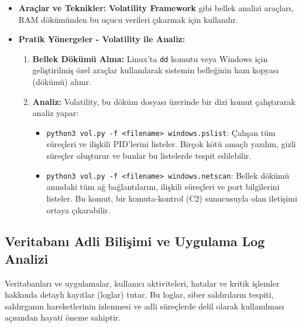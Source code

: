 \begin{itemize}
    \item \textbf{Araçlar ve Teknikler:} \textbf{Volatility Framework} gibi bellek analizi araçları, RAM dökümünden bu uçucu verileri çıkarmak için kullanılır.
    \item \textbf{Pratik Yönergeler - Volatility ile Analiz:}
    \begin{enumerate}
        \item \textbf{Bellek Dökümü Alma:} Linux'ta \texttt{dd} komutu veya Windows için geliştirilmiş özel araçlar kullanılarak sistemin belleğinin ham kopyası (dökümü) alınır.
        \item \textbf{Analiz:} Volatility, bu döküm dosyası üzerinde bir dizi komut çalıştırarak analiz yapar:
        \begin{itemize}
            \item \texttt{python3 vol.py -f \textless{}filename\textgreater{} windows.pslist}: Çalışan tüm süreçleri ve ilişkili PID'lerini listeler. Birçok kötü amaçlı yazılım, gizli süreçler oluşturur ve bunlar bu listelerde tespit edilebilir.
            \item \texttt{python3 vol.py -f \textless{}filename\textgreater{} windows.netscan}: Bellek dökümü anındaki tüm ağ bağlantılarını, ilişkili süreçleri ve port bilgilerini listeler. Bu komut, bir komuta-kontrol (C2) sunucusuyla olan iletişimi ortaya çıkarabilir.
        \end{itemize}
    \end{enumerate}
\end{itemize}

\subsection{Veritabanı Adli Bilişimi ve Uygulama Log Analizi}

Veritabanları ve uygulamalar, kullanıcı aktiviteleri, hatalar ve kritik işlemler hakkında detaylı kayıtlar (loglar) tutar. Bu loglar, siber saldırıların tespiti, saldırganın hareketlerinin izlenmesi ve adli süreçlerde delil olarak kullanılması açısından hayati öneme sahiptir.

